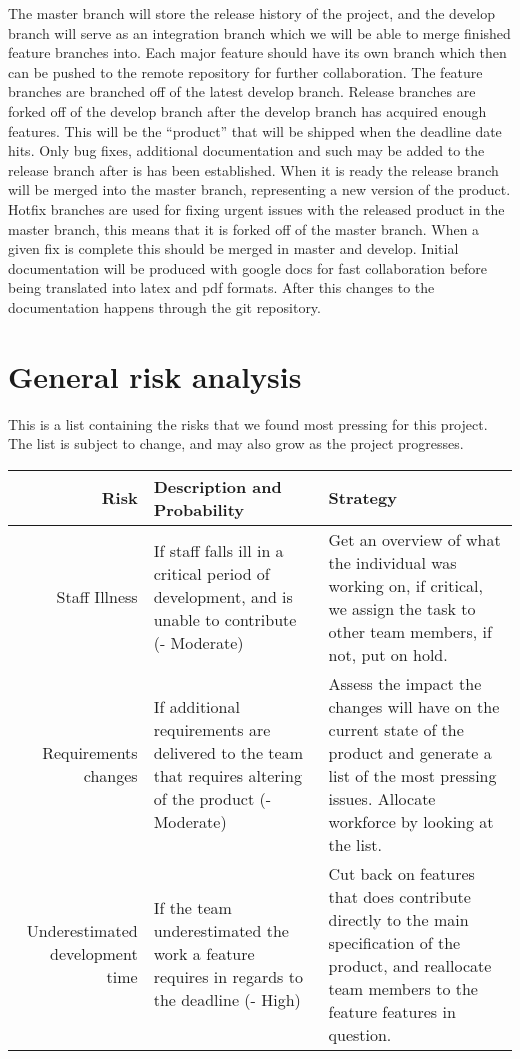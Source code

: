 \documentclass[12pt]{article}%
\begin{document}
The master branch will store the release history of the project, and the develop 		branch will serve as an integration branch which we will be able to merge finished 	feature branches into. Each major feature should have its own branch which then can be pushed to the remote repository for further collaboration. The feature branches are branched off of the latest develop branch.
\vspace{5mm} %
    Release branches are forked off of the develop branch after the develop branch has acquired enough features. This will be the “product” that will be shipped when the deadline date hits. Only bug fixes, additional documentation and such may be added to the release branch after is has been established. When it is ready the release branch will be merged into the master branch, representing a new version of the product.
Hotfix branches are used for fixing urgent issues with the released product in the master branch, this means that it is forked off of the master branch. When a given fix is complete this should be merged in master and develop.
\vspace{5mm} %
Initial documentation will be produced with google docs for fast collaboration before being translated into latex and pdf formats. After this changes to the documentation happens through the git repository.



\section{General risk analysis}
This is a list containing the risks that we found most pressing for this project. The list is subject to change, and may also grow as the project progresses.


\begin{tabularx}{\linewidth}{ r X X }
\hline
Risk & Description and Probability & Strategy \\ \hline

Staff Illness 
& If staff falls ill in a critical period of development, and is unable to contribute (- Moderate)
& Get an overview of what the individual was working on, if critical, we assign the task to other team members, if not, put on hold.\\

Requirements changes        
&If additional requirements are delivered to the team that requires altering of the product (- Moderate)
& Assess the impact the changes will have on the current state of the product and generate a list of the most pressing issues. Allocate workforce by looking at the list.\\ \hline
Underestimated development time
&If the team underestimated the work a feature requires in regards to the deadline (- High)                         
& Cut back on features that does contribute directly to the main specification of the product, and reallocate team members to the feature features in question.                 \\ \hline
\end{tabularx}
\end{document}
